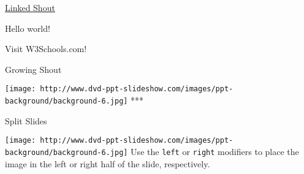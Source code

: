 \documentclass[ignorenonframetext,]{beamer}
\makeatletter
\def\ScaleIfNeeded{%
  \ifdim\Gin@nat@width>\linewidth
    \linewidth
  \else
    \Gin@nat@width
  \fi
}
\let\Oldincludegraphics\includegraphics
\renewcommand{\includegraphics}[2][]{\Oldincludegraphics[width=\ScaleIfNeeded]{#2}}
\makeatother
\begin{document}
\begin{frame}

\begin{block}{\href{}{Linked Shout}}

Hello world!

Visit W3Schools.com!

\end{block}

\end{frame}

\begin{frame}

\begin{block}{Growing Shout}

\texttt{[image: http://www.dvd-ppt-slideshow.com/images/ppt-background/background-6.jpg]}
***

\end{block}

\end{frame}

\begin{frame}{Split Slides}

\texttt{[image: http://www.dvd-ppt-slideshow.com/images/ppt-background/background-6.jpg]}
Use the \texttt{left} or \texttt{right} modifiers to place the image in
the left or right half of the slide, respectively.

\end{frame}
\end{document}
